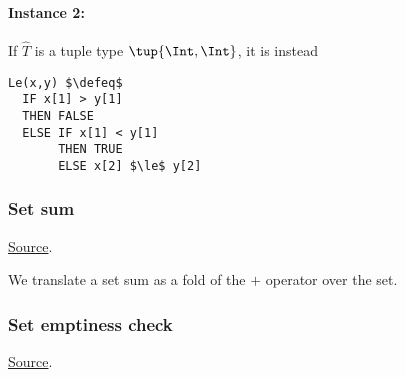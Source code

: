\paragraph{Instance 2:} If $\hat{T}$ is a tuple type $\tup{\Int,\Int}$, it is instead 
\begin{lstlisting}[language=tla,columns=fullflexible]
Le(x,y) $\defeq$ 
  IF x[1] > y[1]
  THEN FALSE
  ELSE IF x[1] < y[1]
       THEN TRUE
       ELSE x[2] $\le$ y[2]
\end{lstlisting}

\subsubsection{ Set sum}
\href{https://github.com/saltiniroberto/ssf/blob/7ea6e18093d9da3154b4e396dd435549f687e6b9/high_level/common/pythonic_code_generic.py#L79-L80}{Source}.



\begin{mathpar}
\end{mathpar}
We translate a set sum as a fold of the $+$ operator over the set.

\subsubsection{ Set emptiness check}
\href{https://github.com/saltiniroberto/ssf/blob/7ea6e18093d9da3154b4e396dd435549f687e6b9/high_level/common/pythonic_code_generic.py#L83-L84}{Source}.



